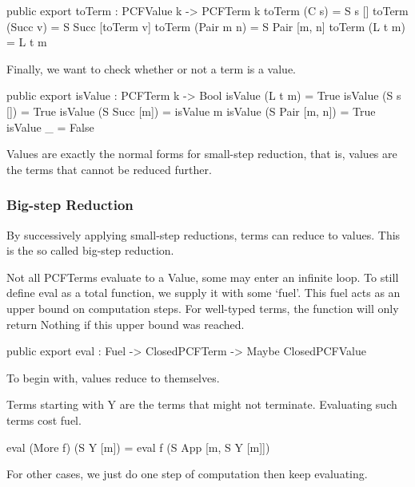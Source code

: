 \begin{code}
public export
toTerm : PCFValue k -> PCFTerm k
toTerm (C s)      = S s []
toTerm (Succ v)   = S Succ [toTerm v]
toTerm (Pair m n) = S Pair [m, n]
toTerm (L t m)    = L t m
\end{code}

Finally, we want to check whether or not a term is a value.

\begin{code}
public export
isValue : PCFTerm k -> Bool
isValue (L t m)         = True
isValue (S s [])        = True
isValue (S Succ [m])    = isValue m
isValue (S Pair [m, n]) = True
isValue _               = False
\end{code}

Values are exactly the normal forms for small-step reduction, that is, values
are the terms that cannot be reduced further.

\subsubsection{Big-step Reduction}

By successively applying small-step reductions, terms can reduce to values.
This is the so called big-step reduction.

Not all PCFTerms evaluate to a Value, some may enter an infinite loop.
To still define eval as a total function, we supply it with some `fuel'.
This fuel acts as an upper bound on computation steps. For well-typed terms,
the function will only return Nothing if this upper bound was reached.

\begin{code}
public export
eval : Fuel -> ClosedPCFTerm -> Maybe ClosedPCFValue
\end{code}

To begin with, values reduce to themselves.


Terms starting with Y are the terms that might not terminate.
Evaluating such terms cost fuel.

\begin{code}
eval (More f) (S Y [m]) = eval f (S App [m, S Y [m]])
\end{code}

For other cases, we just do one step of computation then keep evaluating.

